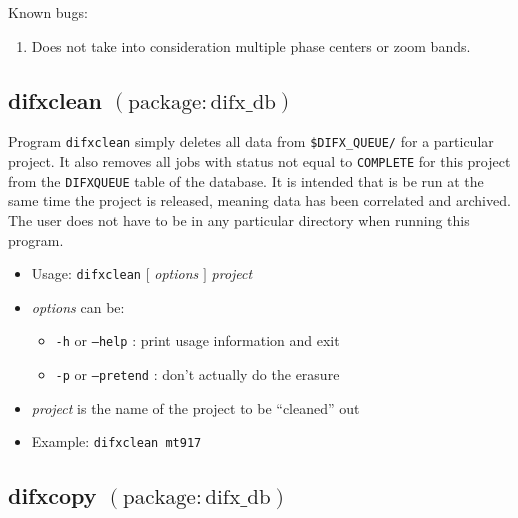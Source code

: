 \noindent
Known bugs:
\begin{enumerate}
\item Does not take into consideration multiple phase centers or zoom bands.
\end{enumerate}







\subsection{difxclean {\small $\mathrm{(package: difx\_db)}$}} \label{sec:difxclean}

Program {\tt difxclean} simply deletes all data from {\tt \$DIFX\_QUEUE/} for a particular project.
It also removes all jobs with status not equal to {\tt COMPLETE} for this project from the {\tt DIFXQUEUE} table of the database.
It is intended that is be run at the same time the project is released, meaning data has been correlated and archived.
The user does not have to be in any particular directory when running this program.

\begin{itemize}
\item[] Usage: {\tt difxclean} $[$ {\em options} $]$ {\em project}
\item[] {\em options} can be:
\begin{itemize}
\item[] {\tt -h} or {\tt --help} : print usage information and exit
\item[] {\tt -p} or {\tt --pretend} : don't actually do the erasure
\end{itemize}
\item[] {\em project} is the name of the project to be ``cleaned'' out
\item[] Example: {\tt difxclean mt917}
\end{itemize}









\subsection{difxcopy {\small $\mathrm{(package: difx\_db)}$}} \label{sec:difxcopy}

